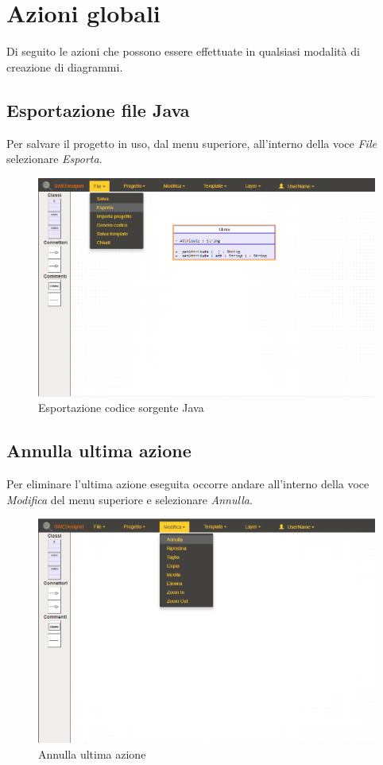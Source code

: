 \section{Azioni globali}
Di seguito le azioni che possono essere effettuate in qualsiasi modalità di creazione di diagrammi.

\subsection{Esportazione file Java}
Per salvare il progetto in uso, dal menu superiore, all'interno della voce \textit{File} selezionare \textit{Esporta}.\\
\begin{figure}[H]
	\centering
		\includegraphics[width=1\linewidth]{res/img/esporta.png}
	\caption{Esportazione codice sorgente Java}
\end{figure}
\newpage

\subsection{Annulla ultima azione}
Per eliminare l'ultima azione eseguita occorre andare all'interno della voce \textit{Modifica} del menu superiore e selezionare \textit{Annulla}.\\
\begin{figure}[H]
	\centering
		\includegraphics[width=1\linewidth]{res/img/annulla.png}
	\caption{Annulla ultima azione}
\end{figure}
\newpage

